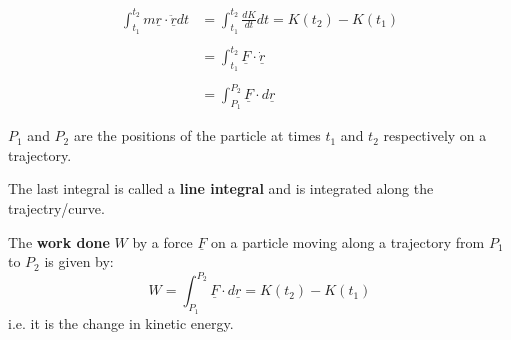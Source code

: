 $$\begin{aligned}  \int_{t_{1}}^{t_{2}} m\underline{r} \cdot \underline{\ddot{r}} dt & = \int_{t_1}^{t_2}\frac{dK}{dt}dt =K(t_{2}) - K(t_{1})        \\ \\
                                                                                   & = \int_{t_{1}}^{t_{2}}\underline{F} \cdot \underline{\dot{r}} \\ \\
                                                                                   & = \int^{P_{2}}_{P_{1}}\underline{F} \cdot d\underline{r}\end{aligned}$$

\begin{note}
	$P_1$ and $P_2$ are the positions of the particle at times $t_1$ and $t_2$ respectively on a trajectory.

	The last integral is called a {\bf line integral} and is integrated along the trajectry/curve.
\end{note}
\clearpage
\begin{definition}
	The {\bf work done} $W$ by a force $\underline{F}$ on a particle moving along a trajectory from $P_1$ to $P_2$ is given by:
	\begin{equation}
		\label{eq: work-done}
		W = \int_{P_{1}}^{P_{2}}\underline{F} \cdot d\underline{r} = K(t_{2}) - K(t_{1})
	\end{equation}
	i.e. it is the change in kinetic energy.
\end{definition}
